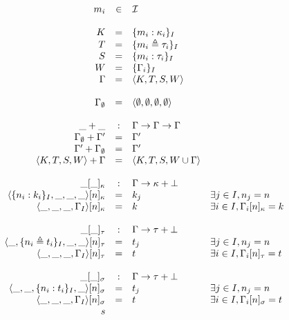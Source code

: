 \documentclass{article}[11pt]
\begin{document}
    \begin{math}
        \begin{array}{rcll}
            m_i & \in & {\cal I} \\
            \\
            K       & =   & \{ m_i : \kappa_i \}_I            \\
            T       & =   & \{ m_i \triangleq \tau_i \}_I     \\
            S       & =   & \{ m_i : \tau_i \}_I              \\
            W       & =   & \{ \Gamma_i \}_I                  \\
            \Gamma  & =   & \langle K, T, S, W \rangle        \\
            \\
            \Gamma_\emptyset & = & \langle \emptyset, \emptyset, \emptyset, \emptyset \rangle \\
            \\
            \_+\_         & : & \Gamma \rightarrow \Gamma \rightarrow \Gamma \\
            \Gamma_\emptyset + \Gamma' & = & \Gamma'    \\
            \Gamma' + \Gamma_\emptyset & = & \Gamma' \\
            \langle K, T, S, W \rangle + \Gamma & =& \langle K, T, S, W \cup \Gamma \rangle \\
            \\
            \_[\_]_\kappa & : & \Gamma \rightarrow \kappa + \bot \\
            \langle \{n_i:k_i\}_I, \_, \_, \_\rangle[n]_\kappa & = & k_j & \exists j \in I, n_j = n \\
            \langle \_, \_, \_, \Gamma_I\rangle[n]_\kappa & = & k & \exists i \in I, \Gamma_i[n]_\kappa = k \\
            \\
            \_[\_]_\tau & : & \Gamma \rightarrow \tau + \bot \\
            \langle \_, \{n_i \triangleq t_i\}_I, \_, \_\rangle[n]_\tau & = & t_j & \exists j \in I, n_j = n \\
            \langle \_, \_, \_, \Gamma_I\rangle[n]_\tau & = & t & \exists i \in I, \Gamma_i[n]_\tau = t \\
            \\
            \_[\_]_\sigma & : & \Gamma \rightarrow \tau + \bot \\
            \langle \_, \_, \{n_i:t_i\}_I, \_\rangle[n]_\sigma & = & t_j & \exists j \in I, n_j = n \\
            \langle \_, \_, \_, \Gamma_I\rangle[n]_\sigma & = & t & \exists i \in I, \Gamma_i[n]_\sigma = t \\s
        \end{array}
    \end{math}
\end{document}

